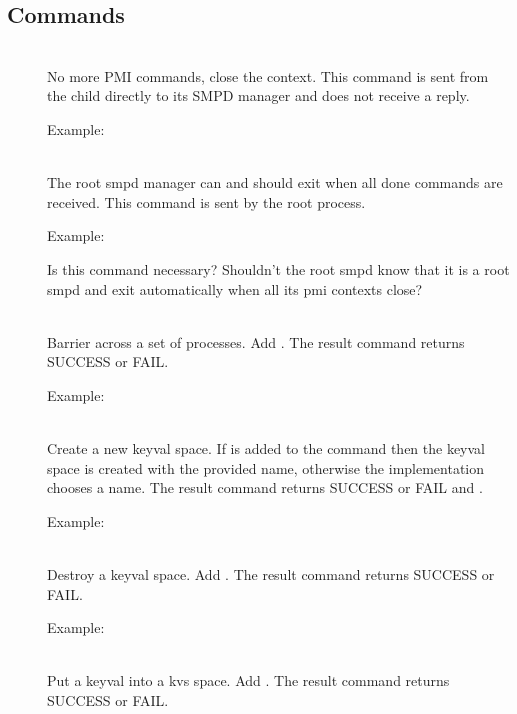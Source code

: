 \documentclass{article}
\begin{document}
\subsection{Commands}
\begin{description}
\item[]\mbox{}\\
No more PMI commands, close the context.  This command is sent from the 
child directly to its SMPD manager and does not receive a reply.

Example: 
\item[]\mbox{}\\
The root smpd manager can and should exit when all done commands are received.
This command is sent by the root process.

Example: 

Is this command necessary?  Shouldn't the root smpd know that it is a root smpd
and exit automatically when all its pmi contexts close?
\item[]\mbox{}\\
Barrier across a set of processes. 
Add .
The result command returns SUCCESS or FAIL.

Example: 
\item[]\mbox{}\\
Create a new keyval space.  If  is added to the command
then the keyval space is created with the provided name, otherwise the 
implementation chooses a name.
The result command returns SUCCESS or FAIL and .

Example: 
\item[]\mbox{}\\
Destroy a keyval space.  Add .
The result command returns SUCCESS or FAIL.

Example: 
\item[]\mbox{}\\
Put a keyval into a kvs space.  Add .
The result command returns SUCCESS or FAIL.


\end{description}
\end{document}
